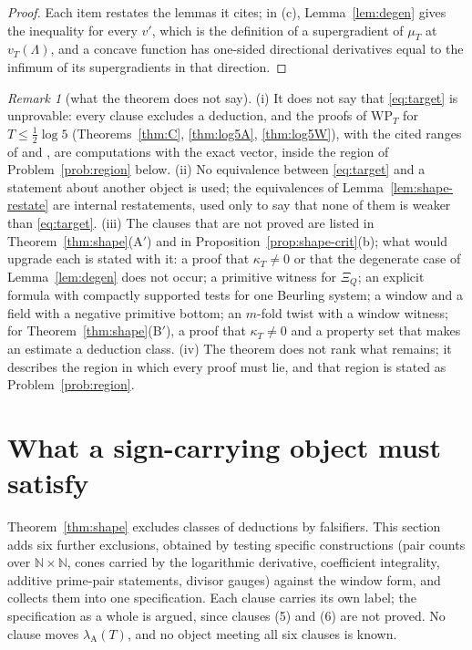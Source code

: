 \documentclass[11pt]{amsart}
\theoremstyle{definition}
\theoremstyle{remark}
\newtheorem{remark}[theorem]{Remark}
\newcommand{\N}{\mathbb N}
\newcommand{\lamA}{\lambda_{\mathrm A}(T)}
\begin{document}
\begin{proof}
Each item restates the lemmas it cites; in (c), Lemma~\ref{lem:degen} gives the inequality for every $v'$, which is the definition of a
supergradient of $\mu_T$ at $v_T(\Lambda)$, and a concave function has one-sided directional derivatives equal to the infimum of its
supergradients in that direction.
\end{proof}

\begin{remark}[what the theorem does not say]\label{rem:shape-scope}
(i) It does not say that \eqref{eq:target} is unprovable: every clause excludes a deduction, and the proofs of $\mathrm{WP}_T$ for
$T\le\frac12\log5$ (Theorems~\ref{thm:C}, \ref{thm:log5A}, \ref{thm:log5W}), with the cited ranges of \cite{Zhu2026} and \cite{Liu2026},
are computations with the exact vector, inside the region of Problem~\ref{prob:region} below. (ii) No equivalence between
\eqref{eq:target} and a statement about another object is used; the equivalences of Lemma~\ref{lem:shape-restate} are internal
restatements, used only to say that none of them is weaker than \eqref{eq:target}. (iii) The clauses that are not proved are listed in
Theorem~\ref{thm:shape}(A$'$) and in Proposition~\ref{prop:shape-crit}(b); what would upgrade each is stated with it: a proof that
$\kappa_T\ne0$ or that the degenerate case of Lemma~\ref{lem:degen} does not occur; a primitive witness for $\Xi_Q$; an explicit formula
with compactly supported tests for one Beurling system; a window and a field with a negative primitive bottom; an $m$-fold twist with
a window witness; for Theorem~\ref{thm:shape}(B$'$), a proof that $\kappa_T\ne0$ and a property set that makes an estimate a deduction class. (iv) The theorem does not rank what remains; it describes the region in which every proof must lie, and that region
is stated as Problem~\ref{prob:region}.
\end{remark}


\section{What a sign-carrying object must satisfy}\label{sec:spec}

Theorem~\ref{thm:shape} excludes classes of deductions by falsifiers. This section adds six further exclusions, obtained by testing
specific constructions (pair counts over $\N\times\N$, cones carried by the logarithmic derivative, coefficient integrality, additive
prime-pair statements, divisor gauges) against the window form, and collects them into one specification. Each clause carries its own
label; the specification as a whole is argued, since clauses (5) and (6) are not proved. No clause moves $\lamA$, and no object meeting
all six clauses is known.
\end{document}
